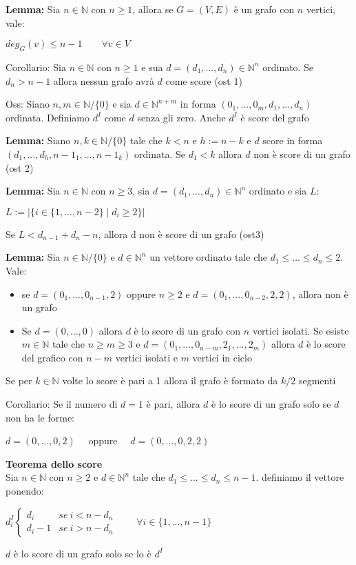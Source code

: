 \documentclass[11pt, letterpaper]{article}
\begin{document}
\textbf{Lemma:} Sia $n\in\mathbb{N}$ con $n\geq 1$, allora se $G=(V,E)$ è un grafo con $n$ vertici, vale:
\begin{center}
    $deg_{G}(v)\leq n-1\qquad\forall v\in V$
\end{center}

Corollario: Sia $n\in\mathbb{N}$ con $n\geq 1$ e sua $d=(d_{1},...,d_{n})\in\mathbb{N}^{n}$ ordinato. Se 
$d_{n}>n-1$ allora nessun grafo avrà $d$ come score (ost 1)

Oss: Siano $n,m\in\mathbb{N}/\{0\}$ e  sia $d\in\mathbb{N}^{n+m}$ in forma $(0_{1},...,0_{m},d_{1},...,d_{n})$ 
ordinata. Definiamo $d^{I}$ come $d$ senza gli zero. Anche $d^{I}$ è score del grafo

\textbf{Lemma:} Siano $n,k\in\mathbb{N}/\{0\}$ tale che $k<n$ e $h:=n-k$ e $d$ score in forma $(d_{1},...,d_{h},
n-1_{1},...,n-1_{k})$ ordinata. Se $d_{1}<k$ allora $d$ non è score di un grafo (ost 2)

\textbf{Lemma:} Sia $n\in\mathbb{N}$ con $n\geq 3$, sia $d=(d_{1},...,
d_{n})\in\mathbb{N}^{n}$ ordinato e sia $L$:
\begin{center}
    $L:=|\{i\in\{1,..., n-2\}\mid d_{i}\geq 2\}|$
\end{center}
Se $L<d_{n-1}+d_{n}-n$, allora d non è score di un grafo (ost3)

\textbf{Lemma:} Sia $n\in\mathbb{N}/\{0\}$ e $d\in\mathbb{N}^{n}$ un vettore ordinato tale che $d_{1}\leq ...\leq
d_{n}\leq 2$. Vale:
\begin{itemize}
    \item se $d=(0_{1},...,0_{n-1},2)$ oppure $n\geq 2$ e $d=(0_{1},...,0_{n-2},2,2)$, allora non è un grafo
    \item Se $d=(0,...,0)$ allora $d$ è lo score di un grafo con $n$ vertici isolati. Se esiste $m\in\mathbb{N}$
    tale che $n\geq m\geq 3$ e $d=(0_{1},...,0_{n-m},2_{1},...,2_{m})$ allora $d$ è lo score del grafico con $n-m$
    vertici isolati e $m$ vertici in ciclo
\end{itemize}
Se per $k\in\mathbb{N}$ volte lo score è pari a 1 allora il grafo è formato da $k/2$ segmenti

Corollario: Se il numero di $d=1$ è pari, allora $d$ è lo score di un grafo solo se $d$ non ha le forme:
\begin{center}
    $d=(0,...,0,2)\quad$ oppure $\quad d=(0,...,0,2,2)$
\end{center}

\textbf{Teorema dello score}\\
Sia $n\in\mathbb{N}$ con $n\geq 2$ e $d\in\mathbb{N}^{n}$ tale che $d_{1}\leq ...\leq d_{n}\leq n-1$. definiamo il 
vettore ponendo:
\begin{center}
    $d_{i}^{I}
    \begin{cases}
        d_{i} & se\ i<n-d_{n}\\
        d_{i}-1 & se\ i>n-d_{n}
    \end{cases}
    \qquad\forall i\in\{1,...,n-1\}$
\end{center}
$d$ è lo score di un grafo solo se lo è $d^{I}$
\end{document}

